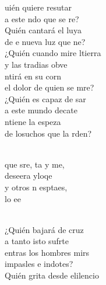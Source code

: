 \documentclass[12pt]{article}
\begin{document}
\begin{multicols*}{2}
        \begin{cancion}%
            uién quiere resutar \\
            a este ndo que se re?\\
            Quién cantará el luya\\
            de e nueva luz que ne?\\
        \jump
            ¿Quién cuando mire ltierra \\
            y las tradias obve\\
            ntirá en su corn  \\
            el dolor de quien se mre?\\
        \jump
            ¿Quién es capaz de sar \\
            a este mundo decate\\
            ntiene la espeza \\
            de losuchos que la rden?\\\jump\\
            \begin{chorus}%
            que sre, ta y me, \\
            deseera yloqe\\
            y otros n esptaes, \\
            lo ee\\
            \end{chorus}%
            \jump\\
            ¿Quién bajará de  cruz \\
            a tanto isto sufrte\\
            entras los hombres mirs \\
            impasles e indotes?\\
        \jump
            Quién grita desde elilencio \\

\end{cancion}
\end{multicols*}
\end{document}
